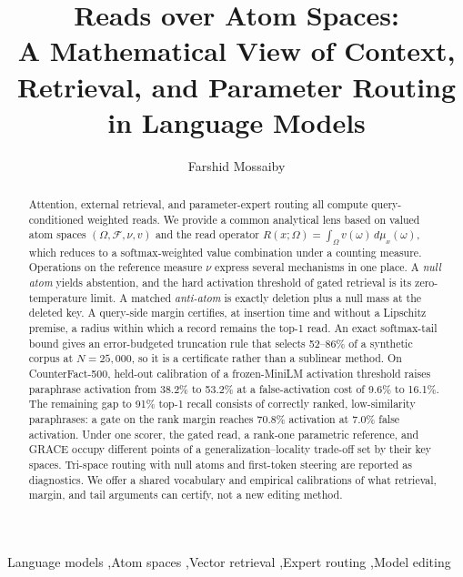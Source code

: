 \documentclass[preprint,12pt]{elsarticle}
\newcommand{\Om}{\Omega}
\newif\ifmarkchanges
\newcommand{\rev}[1]{\ifmarkchanges{\color{blue}#1}\else#1\fi}
\begin{document}
\begin{frontmatter}

\title{Reads over Atom Spaces:\\
A Mathematical View of Context, Retrieval, and Parameter Routing in Language Models}

\author[inst1]{Farshid Mossaiby}

\begin{abstract}
Attention, external retrieval, and parameter-expert routing all compute query-conditioned weighted reads. We provide a common analytical lens based on valued atom spaces $(\Om,\mathcal F,\nu,v)$ and the read operator $R(x;\Om)=\int_\Om v(\omega)\,d\mu_x(\omega)$, which reduces to a softmax-weighted value combination under a counting measure. \rev{Operations on the reference measure $\nu$ express several mechanisms in one place. A \emph{null atom} yields abstention, and the hard activation threshold of gated retrieval is its zero-temperature limit. A matched \emph{anti-atom} is exactly deletion plus a null mass at the deleted key. A query-side margin certifies, at insertion time and without a Lipschitz premise, a radius within which a record remains the top-1 read.} An exact softmax-tail bound gives an error-budgeted truncation rule that selects 52--86\% of a synthetic corpus at $N=25{,}000$, so it is a certificate rather than a sublinear method. On CounterFact-500, held-out calibration of a frozen-MiniLM activation threshold raises paraphrase activation from 38.2\% to 53.2\% at a false-activation cost of 9.6\% to 16.1\%. \rev{The remaining gap to 91\% top-1 recall consists of correctly ranked, low-similarity paraphrases: a gate on the rank margin reaches 70.8\% activation at 7.0\% false activation. Under one scorer, the gated read, a rank-one parametric reference, and GRACE occupy different points of a generalization--locality trade-off set by their key spaces.} Tri-space routing with null atoms and first-token steering are reported as diagnostics. We offer a shared vocabulary and empirical calibrations of what retrieval, margin, and tail arguments can certify, not a new editing method.
\end{abstract}

\begin{keyword}
Language models \sep Atom spaces \sep Vector retrieval \sep Expert routing \sep Model editing
\end{keyword}

\end{frontmatter}
\end{document}
